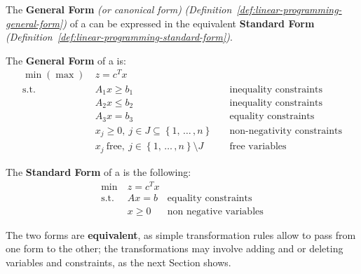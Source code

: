 \documentclass[english]{article}
\begin{document}
The \textbf{General Form} \textit{(or canonical form)} \textit{(Definition~\ref{def:linear-programming-general-form})} of a \LP can be expressed in the equivalent \textbf{Standard Form} \textit{(Definition~\ref{def:linear-programming-standard-form})}.

\begin{definition}
  \label{def:linear-programming-general-form}
  The \textbf{General Form} of a \LP is:
  \begin{align*}
    \min (\max) \  & z = c^T x                                                                                                      \\
    \text{s.t.} \  & A_1 x \geq b_1 \quad                                                       & \text{inequality constraints}     \\
                   & A_2 x \leq b_2 \quad                                                       & \text{inequality constraints}     \\
                   & A_3 x = b_3 \quad                                                          & \text{equality constraints}       \\
                   & x_j \geq 0,\ j \in J \subseteq \left\{ 1, \, \ldots \,, n \right\} \quad   & \text{non-negativity constraints} \\
                   & x_j \ \text{free}, \ j \in \left\{ 1, \, \ldots \,, n \right\} \setminus J & \text{free variables}
  \end{align*}
\end{definition}

\begin{definition}
  \label{def:linear-programming-standard-form}
  The \textbf{Standard Form} of a \LP is the following:
  \begin{align*}
    \min \         & z = c^T x &                               \\
    \text{s.t.} \  & Ax = b    & \text{equality constraints}   \\
                   & x \geq 0  & \text{non negative variables}
  \end{align*}
\end{definition}

The two forms are \textbf{equivalent}, as simple transformation rules allow to pass from one form to the other;
the transformations may involve adding and or deleting variables and constraints, as the next Section shows.
\end{document}
